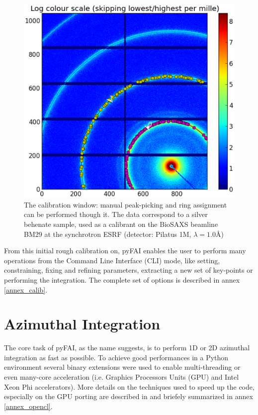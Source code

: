 \documentclass[preprint]{iucr}
\begin{document}
\begin{figure}
\label{calib}
\begin{center}
\includegraphics[width=15cm]{calib.eps}
\caption{The calibration window: manual peak-picking and
ring assignment can be performed though it.
The data correspond to a silver
behenate sample, used as a calibrant on the BioSAXS beamline BM29 at the synchrotron ESRF
(detector: Pilatus 1M, $\lambda=1.0${\AA})}
\end{center}
\end{figure}

From this initial rough calibration on, pyFAI enables  the user to perform
many operations from the Command Line Interface (CLI) mode, like setting, constraining, fixing and
refining parameters, extracting a new set of key-points or performing the
integration. The complete set of options is described in annex
\ref{annex_calib}.

\section{Azimuthal Integration}

The core task of pyFAI, as the name suggests, is to perform 1D or 2D azimuthal
integration as fast as possible. To achieve good performances in a Python environment
several binary extensions were used to enable multi-threading or even many-core
acceleration (i.e. Graphics Processors Units (GPU) and Intel Xeon Phi
accelerators).
More details on the techniques used to speed up the code, especially on the GPU porting
are described in \cite{kieffer_ashiotis-proc-euroscipy-2014} and briefely
summarized in annex \ref{annex_opencl}.
\end{document}
